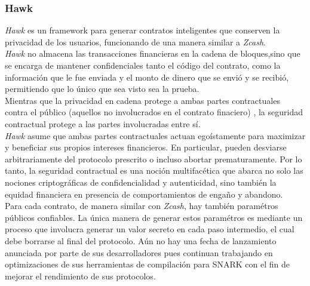 \documentclass[oneside,10pt]{article}
\begin{document}
\subsubsection{Hawk}
\emph{Hawk} es un framework para generar contratos inteligentes que conserven la privacidad de los usuarios, funcionando de una manera similar a \emph{Zcash}. \\
\emph{Hawk} no almacena las transacciones financieras en la cadena de bloques,sino que se encarga de mantener confidenciales tanto el código del contrato, como la información que le fue enviada y el monto de dinero que se envió y se recibió, permitiendo que lo único que sea visto sea la prueba. \\
Mientras que la privacidad en cadena protege a ambas partes contractuales contra el público (aquellos no involucrados en el contrato finaciero) , la seguridad contractual protege a las partes involucradas entre sí.\\
\emph{Hawk} asume que ambas partes contractuales actuan egoístamente para maximizar y beneficiar sus propios intereses financieros. En particular, pueden desviarse arbitrariamente del protocolo prescrito o incluso abortar prematuramente. Por lo tanto, la seguridad contractual es una noción multifacética que abarca no solo las nociones criptográficas de confidencialidad y autenticidad, sino también la equidad financiera en presencia de comportamientos de engaño y abandono. \\
Para cada contrato, de manera similar con \emph{Zcash}, hay también paramétros públicos confiables. La única manera de generar estos paramétros es mediante un proceso que involucra generar un valor secreto en cada paso intermedio, el cual debe borrarse al final del protocolo. 
Aún no hay una fecha de lanzamiento anunciada por parte de sus desarrolladores pues continuan trabajando en optimizaciones de sus herramientas de compilación para SNARK con el fin de mejorar el rendimiento de sus protocolos.
\end{document}

